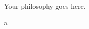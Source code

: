 \documentclass[12pt, a4paper, twoside]{article}
\begin{document}
\maketitle{}

Your philosophy goes here.

\newpage

a

\printbibliography
\end{document}
